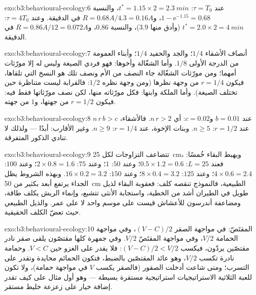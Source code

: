 \begin{solution}{exo:b3:behavioural-ecology:6}
عند $\tau = T_{0}$: $t^{*} = 1.15\times 2 = \qty{2.3}{min}$، والنسبة $1 -
\mathrm{e}^{-1.15} = 0.68$، و$R = 0.68A/4.3 = 0.16A$ في الدقيقة. وعند $\tau =
4T_{0}$: $t^{*} = 2.0\times 2 = \qty{4}{min}$ (وأدق منها $3.9$)،
والنسبة $0.86$، و$R = 0.86A/12 = 0.072A$ في الدقيقة.
\end{solution}

\begin{solution}{exo:b3:behavioural-ecology:7}
أنصاف الأشقاء $1/4$؛ والجد والحفيد $1/4$؛ وأبناء العمومة من الدرجة الأولى $1/8$.
وأما الشغّالة  وأخوها: فهو فردي الصيغة وليس
له إلا مورّثات أمهما؛ ومن مورّثات الشغّالة جاء النصف من الأم
ونصف تلك هو النسخ التي تلقاها، فيكون $r = 1/4$ من وجهة
نظرها (ومن وجهة نظره $1/2$: فالقرابة ليست متناظرة حين
تختلف الصيغة). وأما الملكة وابنها: فكل مورّثاته منها، لكن
نصف مورّثاتها فقط فيه: فيكون $r = 1/2$ من جهتها، و$1$ من جهته.
\end{solution}

\begin{solution}{exo:b3:behavioural-ecology:8}
$n\,r\,b > c$ عند $b = 0.01$ و$c = 0.02$: أي $n\,r > 2$. فالأشقاء، عند $r
= 1/2$: $n \ge 5$. وبنات الإخوة، عند $r = 1/4$: $n \ge 9$. وغير الأقارب: أبدًا ---
ولذلك لا تنادي الذكور المتفرقة.
\end{solution}

\begin{solution}{exo:b3:behavioural-ecology:9}
تتضاعف التزاوجات لكل \qty{25}{cm}، ويهبط البقاء خُمسًا: فعند $L = 25$:
$0.5\times 1.2 = 0.6$؛ وعند $50$: $1$؛ وعند $75$: $2\times 0.8 = 1.6$؛ وعند $100$:
$4\times 0.6 = 2.4$؛ وعند $125$: $8\times 0.4 = 3.2$؛ وعند $150$: $16\times 0.2 =
3.2$. وبهذه الشروط يظل الجداء يرتفع أبعد بكثير من
\qty{50}{cm} الطبيعية، فالنموذج تنقصه كلف: فعقوبة البقاء
لذيل طويل في الطيران أشد من الخطية، واستجابة الأنثى
تتشبع، وإنماء الريش يكلف طاقة، ومضاعفة أندرسون
للأعشاش قيست على موسم واحد لا على عمر. والذيل الطبيعي
حيث تعضّ الكلف الحقيقية.
\end{solution}

\begin{solution}{exo:b3:behavioural-ecology:10}
المقتَصّ: في مواجهة الصقر $(V - C)/2$، وفي مواجهة الحمامة $V/2$، وفي مواجهة
المقتَصّ $V/2$. وفي جمهرة كلها مقتصّون يلقى صقر نادر
مقتصّين يردّون، فيكسب $(V - C)/2 < V/2$: فلا يقدر على
الغزو حين $V < C$. وحمامة نادرة تكسب $V/2$، وهو عائد المقتصّين
بالضبط، فتكون الحمائم محايدة وتقدر على التسرب؛ ومتى شاعت
أدخلت الصقور (فالصقر يكسب $V$ في مواجهة حمامة)، ولا تكون
للعبة الثلاثية الاستراتيجيات استراتيجية مستقرة بسيطة --- وهو
أول مثال على كيف تقدر إضافة خيار على زعزعة خليط مستقر.
\end{solution}

